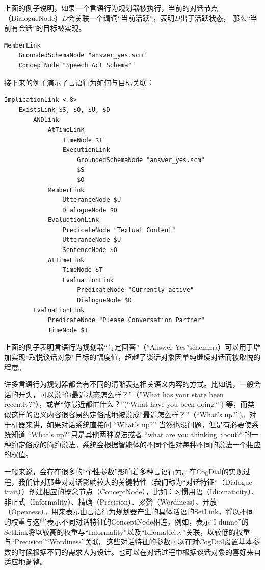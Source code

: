 上面的例子说明，如果一个言语行为规划器被执行，当前的对话节点（DialogueNode）$D$会关联一个谓词“当前活跃”，表明$D$出于活跃状态， 那么“当前有会话”的目标被实现。

 \begin{verbatim}
MemberLink
	GroundedSchemaNode "answer_yes.scm"
	ConceptNode "Speech Act Schema"
\end{verbatim}

接下来的例子演示了言语行为如何与目标关联：

 \begin{verbatim}
ImplicationLink <.8>
	ExistsLink $S, $O, $U, $D
		ANDLink
			AtTimeLink
				TimeNode $T
				ExecutionLink
					GroundedSchemaNode "answer_yes.scm"
					$S
					$O
			MemberLink
				UtteranceNode $U
				DialogueNode $D
			EvaluationLink
				PredicateNode "Textual Content"
				UtteranceNode $U
				SentenceNode $O
			AtTimeLink
				TimeNode $T
				EvaluationLink
					PredicateNode "Currently active"
					DialogueNode $D			
		EvaluationLink
			PredicateNode "Please Conversation Partner"
			TimeNode $T
\end{verbatim}

上面的例子表明言语行为规划器“肯定回答”（”Answer Yes”schemma）可以用于增加实现“取悦谈话对象”目标的幅度值，超越了谈话对象因单纯继续对话而被取悦的程度。

许多言语行为规划器都会有不同的清晰表达相关语义内容的方式。比如说，一般会话的开头，可以说“你最近状态怎么样？”（”What has your state been recently?”），或者“你最近都忙什么？”(“What have you been doing?”) 等，而类似这样的语义内容很容易约定俗成地被说成“最近怎么样？”（“What’s up?”)。对于机器来讲，如果对话系统直接问 “What’s up?” 当然也没问题，但是有必要使系统知道 “What’s up?”只是其他两种说法或者 “what are you thinking about?“的一种约定俗成的简约说法。系统会根据智能体的不同个性对每种不同的说法一个相应的权值。

一般来说，会存在很多的“个性参数”影响着多种言语行为。在CogDial的实现过程，我们针对那些对对话影响较大的关键特性（我们称为“对话特征”（Dialogue-trait））创建相应的概念节点（ConceptNode），比如：习惯用语（Idiomaticity）、非正式（Informality）、精确（Precision）、累赘（Wordiness）、开放（Openness）。用来表示由言语行为规划器产生的具体话语的SetLink，将以不同的权重与这些表示不同对话特征的ConceptNode相连。例如，表示“I dunno”的SetLink将以较高的权重与“Informality”以及“Idiomaticity”关联，以较低的权重与“Precision”“Wordiness”关联。这些对话特征的参数可以在对CogDial设置基本参数的时候根据不同的需求人为设计。也可以在对话过程中根据谈话对象的喜好来自适应地调整。

